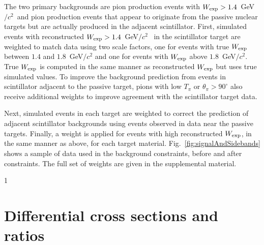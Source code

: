 \documentclass[aps,preprint,showpacs,superscriptaddress,letterpaper,showkeys,superscriptaddress,nofootinbib,floatfix]{revtex4-1}
\newcommand{\Wexp}{\ensuremath{W_{\rm\scriptstyle exp}}}
\newcommand{\gevcsq}{GeV$/c^2$}
\newcommand{\kevinComment}[1]{{\noindent \bf\color{purple} \small [KSM: #1]}}
\newcommand{\lauraComment}[1]{{\noindent \bf\color{teal} \small [LJF: #1]}}
\newcommand{\firstReviewAdd}[1]{{\bf\color{blue} \protect #1}}
\newcommand{\firstReviewStrike}[1]{{\bf\color{blue}\protect \sout{#1}}}
\newcommand{\firstRefereeAdd}[1]{{\bf\color{green} \protect #1}}
\newcommand{\firstRefereeStrike}[1]{{\bf\color{green}\protect \sout{#1}}}
\newcommand{\showSections}[0]{0}
\renewcommand{\kevinComment}[1]{}
\renewcommand{\lauraComment}[1]{}
\renewcommand{\firstReviewAdd}[1]{\protect #1}
\renewcommand{\firstReviewStrike}[1]{}
\renewcommand{\firstRefereeAdd}[1]{\protect #1}
\renewcommand{\firstRefereeStrike}[1]{}
\newcommand{\supp}{the supplemental material}
\newif\ifPRLandSupp
\begin{document}
The two primary backgrounds \firstRefereeStrike{to this signal} are pion production events with $\Wexp>1.4$~\gevcsq~and pion production events that appear to originate from the passive nuclear targets but are actually produced in the adjacent scintillator.  First, simulated events with reconstructed $\Wexp>1.4$~\gevcsq~ in the scintillator target are weighted to match data using two scale factors, one for events with true $\Wexp$ between $1.4$ and {$1.8$~\gevcsq} and one for events with $\Wexp$ above $1.8$~\gevcsq.  \firstRefereeAdd{True $\Wexp$ is computed in the same manner as reconstructed $\Wexp$ but uses true simulated values.}  \firstRefereeStrike{At this stage, in order t}\firstRefereeAdd{T}o improve the background prediction from events in scintillator adjacent to the passive target, pions with low $T_\pi$ or $\theta_\pi > 90^\circ$ also receive additional weight\firstRefereeStrike{ correction}s to improve \firstRefereeStrike{their} agreement with the scintillator target data.  
\firstReviewStrike{Second,}
\firstReviewAdd{ Next,} simulated events in each target are 
\firstReviewStrike{then} weighted to correct the prediction of adjacent scintillator backgrounds using  events observed in data near the passive targets.  Finally, a weight is applied for events with high reconstructed $\Wexp$, in the same manner as above, for each target material.  Fig.~\ref{fig:signalAndSidebands} shows a sample of data used in the background constraints, before and after constraints.  The full set of weights are given in \ifPRLandSupp
\supp\firstRefereeStrike{, Sec.\ref{section:SBTune}}.
\else
\supp.
\fi



\if\showSections1 \section{Differential cross sections and ratios} \fi
\end{document}
